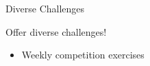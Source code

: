 \documentclass[aspectratio=169]{beamer}
\begin{document}

\begin{frame}[fragile]{Diverse Challenges}
\centerline{\Large{\alert{Offer diverse challenges!}}}
\pause
\begin{itemize}[<+->]
\item Weekly competition exercises
\end{itemize}
\end{frame}
\end{document}
